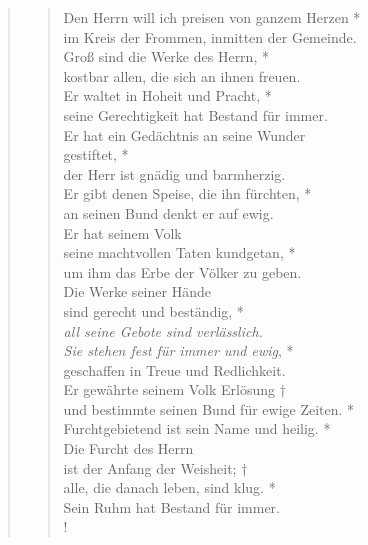 \medskip


\def\greinitialformat#1{{\fontsize{40}{40}\selectfont #1}}
\gresetfirstlineaboveinitial{\small \textcolor{red}{Ps 110(111)}}{}
\setaboveinitialseparation{0.72mm}


\medskip


\begin{quote}
\begin{verse}

Den Herrn will ich preisen von ganzem Herzen *\\
im Kreis der Frommen, inmitten der Gemeinde.\\
\vin Groß sind die Werke des Herrn, *\\
\vin kostbar allen, die sich an ihnen freuen.\\
Er waltet in Hoheit und Pracht, *\\
seine Gerechtigkeit hat Bestand für immer.\\
\vin Er hat ein Gedächtnis an seine Wunder\\ 
\vin gestiftet, *\\
\vin der Herr ist gnädig und barmherzig.\\
Er gibt denen Speise, die ihn fürchten, *\\
an seinen Bund denkt er auf ewig.\\
\vin Er hat seinem Volk\\
\vin seine machtvollen Taten kundgetan, *\\
\vin um ihm das Erbe der Völker zu geben. \\
Die Werke seiner Hände\\
sind gerecht und beständig, *\\
{\it{all seine Gebote sind verlässlich.\\
\vin Sie stehen fest für immer und ewig}}, *\\
\vin geschaffen in Treue und Redlichkeit.\\
Er gewährte seinem Volk Erlösung †\\
und bestimmte seinen Bund für ewige Zeiten. *\\
Furchtgebietend ist sein Name und heilig. *\\
\vin Die Furcht des Herrn\\ 
\vin ist der Anfang der Weisheit; †\\
\vin alle, die danach leben, sind klug. *\\
\vin Sein Ruhm hat Bestand für immer.\\!

\end{verse}
 
\end{quote}


